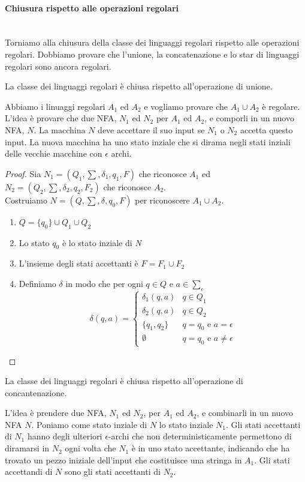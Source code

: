 \documentclass[12pt]{report}
\newcounter{theorem}
\begin{document}
	\paragraph{Chiusura rispetto alle operazioni regolari} \quad \\
	Torniamo alla chiusura della classe dei linguaggi regolari rispetto alle operazioni regolari. Dobbiamo provare che l'unione, la concatenazione e lo star di linguaggi regolari sono ancora regolari.
	\begin{theorem}{}{}
		La classe dei linguaggi regolari è chiusa rispetto all'operazione di unione.
	\end{theorem}
	Abbiamo i linuaggi regolari $A_1$ ed $A_2$ e vogliamo provare che $A_1 \cup A_2$ è regolare. L'idea è provare che due NFA, $N_1$ ed $N_2$ per $A_1$ ed $A_2$, e comporli in un nuovo NFA, $N$. La macchina  $N$ deve accettare il suo input se $N_1$ o $N_2$ accetta questo input. La nuova macchina ha uno stato inziale che si dirama negli stati inziali delle vecchie macchine con $\epsilon$ archi.
	\begin{proof}
		Sia $N_1 = (Q_1, \sum, \delta_1, q_1, F)$ che riconosce $A_1$ ed $N_2 = (Q_2, \sum, \delta_2, q_2, F_2)$ che riconosce $A_2$. \\
		Costruiamo $N = (Q, \sum, \delta, q_0, F)$ per riconoscere $A_1\cup A_2$.
		\begin{enumerate}
			\item $Q = \{q_0\} \cup Q_1 \cup Q_2$
			\item Lo stato $q_0$ è lo stato inziale di \textit{N}
			\item L'insieme degli stati accettanti è $F = F_1 \cup F_2$
			\item Definiamo $\delta$ in modo che per ogni $q \in Q$ e $a \in \sum_\epsilon$
			\[
			\delta(q, a) = \begin{cases}
				\delta_1(q, a) & q\in Q_1 \\
				\delta_2(q, a) & q \in Q_2 \\
				\{q_1, q_2\} & q = q_0 \text{ e } a = \epsilon \\
				\emptyset & q = q_0 \text{ e } a \neq \epsilon
			\end{cases}
			\]
		\end{enumerate}
	\end{proof}
	\begin{theorem}
		La classe dei linguaggi regolari è chiusa rispetto all'operazione di concantenazione.
	\end{theorem}
	L'idea è prendere due NFA, $N_1$ ed $N_2$, per $A_1$ ed $A_2$, e combinarli in un nuovo NFA $N$. Poniamo come stato inziale di $N$ lo stato inziale $N_1$. Gli stati accettanti di $N_1$ hanno degli ulteriori $\epsilon$-archi che non deterministicamente permettono di diramarsi in $N_2$ ogni volta che $N_1$ è in uno stato accettante, indicando che ha trovato un pezzo iniziale dell'input che costituisce una stringa in $A_1$. Gli stati accettandi di $N$ sono gli stati accettanti di $N_2$.
\end{document}
